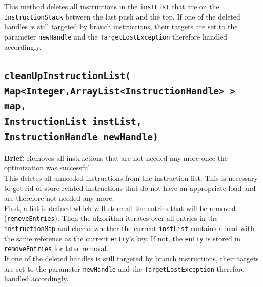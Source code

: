 This method deletes all instructions in the \texttt{instList} that are on the \texttt{instructionStack} between the last push and the top. If one of the deleted handles is still targeted by branch instructions, their targets are set to the parameter \texttt{newHandle} and the \texttt{TargetLostException} therefore handled accordingly.
\subsection{\texttt{cleanUpInstructionList(\\
\hspace{2cm}Map<Integer,ArrayList<InstructionHandle> > map,\\
\hspace{2cm}InstructionList instList,\\
\hspace{2cm}InstructionHandle newHandle)}}
\label{subsec:cleanup}
\textbf{Brief: }Removes all instructions that are not needed any more once the optimization was successful. \\

This deletes all unneeded instructions from the instruction list. This is necessary to get rid of store related instructions that do not have an appropriate load and are therefore not needed any more. \\
First, a list is defined which will store all the entries that will be removed (\texttt{removeEntries}). Then the algorithm iterates over all entries in the \texttt{instructionMap} and checks whether the current \texttt{instList} contains a load with the same reference as the current \texttt{entry}’s key. If not, the \texttt{entry} is stored in \texttt{removeEntries} for later removal.\\
If one of the deleted handles is still targeted by branch instructions, their targets are set to the parameter \texttt{newHandle} and the \texttt{TargetLostException} therefore handled accordingly.